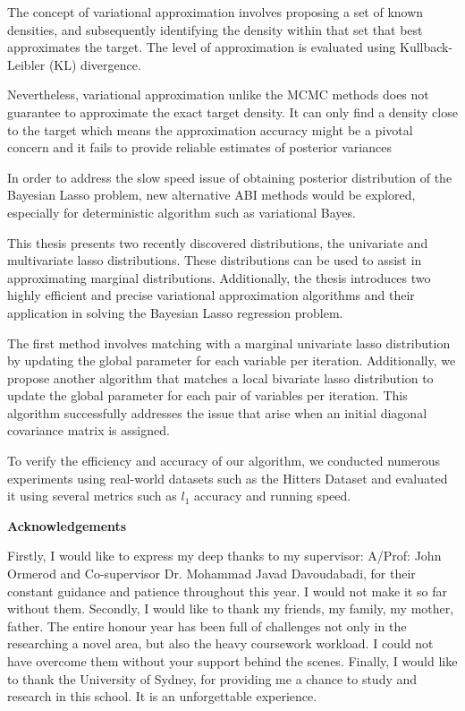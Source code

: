 The concept of variational approximation involves proposing a set of known densities, and subsequently identifying the density within that set that best approximates the target. The level of approximation is evaluated using Kullback-Leibler (KL) divergence.

Nevertheless, variational approximation unlike the MCMC methods does not guarantee to approximate the exact target density. It can only find a density close to the target which means the approximation accuracy might  be a pivotal concern and it fails to provide reliable estimates of posterior variances

In order to address the slow speed issue of obtaining posterior distribution of the Bayesian Lasso problem, new alternative ABI methods would be explored, especially for deterministic algorithm such as variational Bayes.

This thesis presents two recently discovered distributions, the univariate and multivariate lasso distributions. These distributions can be used to assist in approximating marginal distributions. Additionally, the thesis introduces two highly efficient and precise variational approximation algorithms and their application in solving the Bayesian Lasso regression problem.


The first method involves matching with a marginal univariate lasso distribution by updating the global parameter for each variable per iteration. Additionally, we propose another algorithm that matches a local bivariate lasso distribution to update the global parameter for each pair of variables per iteration. This algorithm successfully addresses the issue that arise when an initial diagonal covariance matrix is assigned.

To verify the efficiency and accuracy of our algorithm, we conducted numerous experiments using real-world datasets such as the Hitters Dataset and evaluated it using several metrics such as $l_1$ accuracy and running speed.


\newpage

\begin{center}
    \textbf{\large Acknowledgements}\\
    \vspace{0.5cm}
\end{center}
	Firstly, I would like to express my deep thanks to my supervisor: A/Prof: John Ormerod and Co-supervisor Dr. Mohammad Javad Davoudabadi, for their constant guidance and patience throughout this year. I would not make it so far without them.
   	Secondly, I would like to thank my friends, my family, my mother, father. The entire honour year has been full of challenges not only in the researching a novel area, but also the heavy coursework workload. I could not have overcome them without your support behind the scenes.
    Finally, I would like to thank the University of Sydney, for providing me a chance to study and research in this school. It is an unforgettable experience.
\vfill
\hspace{0pt}
\pagebreak
\newpage